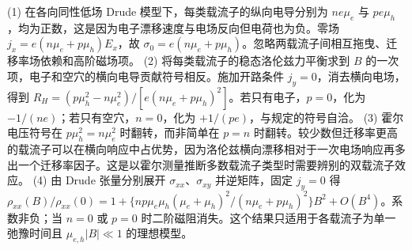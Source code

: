 (1) 在各向同性低场 Drude 模型下，每类载流子的纵向电导分别为 \(ne\mu_e\) 与 \(pe\mu_h\)，均为正数，这是因为电子漂移速度与电场反向但电荷也为负。零场 \(j_x=e(n\mu_e+p\mu_h)E_x\)，故 \(\sigma_0=e(n\mu_e+p\mu_h)\)。忽略两载流子间相互拖曳、迁移率场依赖和高阶磁场项。
(2) 将每类载流子的稳态洛伦兹力平衡求到 \(B\) 的一次项，电子和空穴的横向电导贡献符号相反。施加开路条件 \(j_y=0\)，消去横向电场，得到 \(R_H=(p\mu_h^2-n\mu_e^2)/[e(n\mu_e+p\mu_h)^2]\)。若只有电子，\(p=0\)，化为 \(-1/(ne)\)；若只有空穴，\(n=0\)，化为 \(+1/(pe)\)，与规定的符号自洽。
(3) 霍尔电压符号在 \(p\mu_h^2=n\mu_e^2\) 时翻转，而非简单在 \(p=n\) 时翻转。较少数但迁移率更高的载流子可以在横向响应中占优势，因为洛伦兹横向漂移相对于一次电场响应再多出一个迁移率因子。这是以霍尔测量推断多数载流子类型时需要辨别的双载流子效应。
(4) 由 Drude 张量分别展开 \(\sigma_{xx}\)、\(\sigma_{xy}\) 并逆矩阵，固定 \(j_y=0\) 得 \(\rho_{xx}(B)/\rho_{xx}(0)=1+\{np\mu_e\mu_h(\mu_e+\mu_h)^2/(n\mu_e+p\mu_h)^2\}B^2+O(B^4)\)。系数非负；当 \(n=0\) 或 \(p=0\) 时二阶磁阻消失。这个结果只适用于各载流子为单一弛豫时间且 \(\mu_{e,h}|B|\ll1\) 的理想模型。
